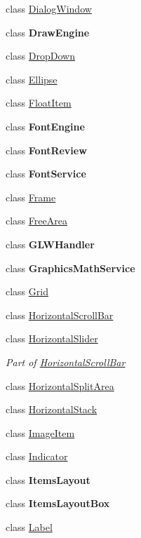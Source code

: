 \begin{DoxyCompactItemize}
\item 
class \mbox{\hyperlink{class_space_v_i_l_1_1_dialog_window}{Dialog\+Window}}
\item 
class {\bfseries Draw\+Engine}
\item 
class \mbox{\hyperlink{class_space_v_i_l_1_1_drop_down}{Drop\+Down}}
\item 
class \mbox{\hyperlink{class_space_v_i_l_1_1_ellipse}{Ellipse}}
\item 
class \mbox{\hyperlink{class_space_v_i_l_1_1_float_item}{Float\+Item}}
\item 
class {\bfseries Font\+Engine}
\item 
class {\bfseries Font\+Review}
\item 
class {\bfseries Font\+Service}
\item 
class \mbox{\hyperlink{class_space_v_i_l_1_1_frame}{Frame}}
\item 
class \mbox{\hyperlink{class_space_v_i_l_1_1_free_area}{Free\+Area}}
\item 
class {\bfseries G\+L\+W\+Handler}
\item 
class {\bfseries Graphics\+Math\+Service}
\item 
class \mbox{\hyperlink{class_space_v_i_l_1_1_grid}{Grid}}
\item 
class \mbox{\hyperlink{class_space_v_i_l_1_1_horizontal_scroll_bar}{Horizontal\+Scroll\+Bar}}
\item 
class \mbox{\hyperlink{class_space_v_i_l_1_1_horizontal_slider}{Horizontal\+Slider}}
\begin{DoxyCompactList}\small\item\em Part of \mbox{\hyperlink{class_space_v_i_l_1_1_horizontal_scroll_bar}{Horizontal\+Scroll\+Bar}} \end{DoxyCompactList}\item 
class \mbox{\hyperlink{class_space_v_i_l_1_1_horizontal_split_area}{Horizontal\+Split\+Area}}
\item 
class \mbox{\hyperlink{class_space_v_i_l_1_1_horizontal_stack}{Horizontal\+Stack}}
\item 
class \mbox{\hyperlink{class_space_v_i_l_1_1_image_item}{Image\+Item}}
\item 
class \mbox{\hyperlink{class_space_v_i_l_1_1_indicator}{Indicator}}
\item 
class {\bfseries Items\+Layout}
\item 
class {\bfseries Items\+Layout\+Box}
\item 
class \mbox{\hyperlink{class_space_v_i_l_1_1_label}{Label}}

\end{DoxyCompactItemize}
